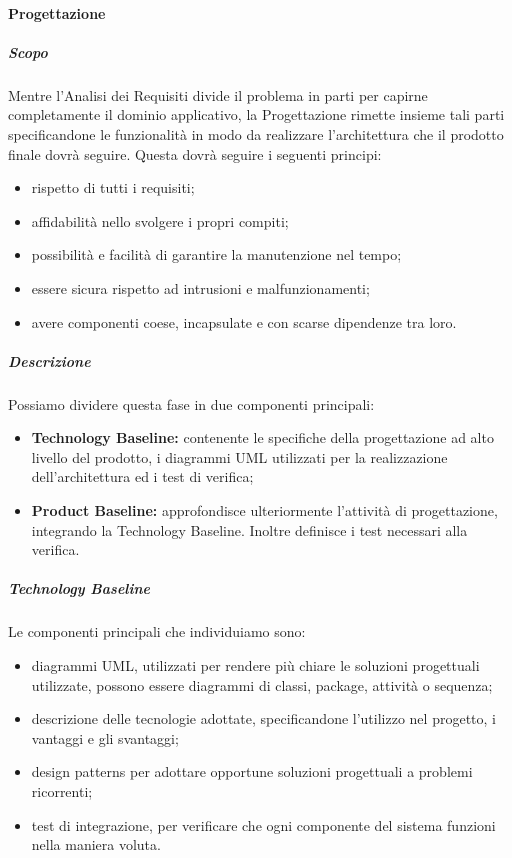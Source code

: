 \documentclass[]{article}
\begin{document}
					\paragraph{Progettazione} %
						\subparagraph{Scopo} %
						Mentre l'Analisi dei Requisiti divide il problema in parti per capirne completamente il dominio applicativo, la Progettazione rimette insieme tali parti specificandone le funzionalità in modo da realizzare l'architettura che il prodotto finale dovrà seguire. Questa dovrà seguire i seguenti principi:
						\begin{itemize}
							\item rispetto di tutti i requisiti;
							\item affidabilità nello svolgere i propri compiti;
							\item possibilità e facilità di garantire la manutenzione nel tempo;
							\item essere sicura rispetto ad intrusioni e malfunzionamenti;
							\item avere componenti coese, incapsulate e con scarse dipendenze tra loro.
						\end{itemize}
						\subparagraph{Descrizione} %
						Possiamo dividere questa fase in due componenti principali:
						\begin{itemize}
							\item \textbf{Technology Baseline:} contenente le specifiche della progettazione ad alto livello del prodotto, i diagrammi UML utilizzati per la realizzazione dell'architettura ed i test di verifica;
							\item \textbf{Product Baseline:} approfondisce ulteriormente l'attività di progettazione, integrando la Technology Baseline. Inoltre definisce i test necessari alla verifica.
						\end{itemize}
						\subparagraph{Technology Baseline} %
						Le componenti principali che individuiamo sono:
						\begin{itemize}
							\item diagrammi UML, utilizzati per rendere più chiare le soluzioni progettuali utilizzate, possono essere diagrammi di classi, package, attività o sequenza;
							\item descrizione delle tecnologie adottate, specificandone l'utilizzo nel progetto, i vantaggi e gli svantaggi;
							\item design patterns per adottare opportune soluzioni progettuali a problemi ricorrenti;
							\item test di integrazione, per verificare che ogni componente del sistema funzioni nella maniera voluta.
						\end{itemize} 
\end{document}
